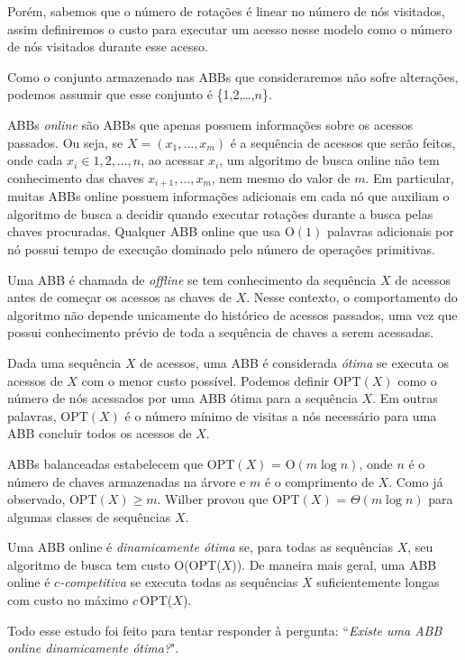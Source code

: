 Porém, sabemos que o número de rotações é linear no número de nós visitados, assim definiremos o custo para executar um acesso nesse modelo como o número de nós visitados durante esse acesso.

Como o conjunto armazenado nas ABBs que consideraremos não sofre alterações, podemos assumir que esse conjunto é \{1,2,\ldots,$n$\}.

ABBs \textit{online} são ABBs que apenas possuem informações sobre os acessos passados. Ou seja, se $X = (x_1, \ldots, x_m)$ é a sequência de acessos que serão feitos, onde cada $x_i \in {1,2,\ldots,n}$, ao acessar $x_{i}$, um algoritmo de busca online não tem conhecimento das chaves $x_{i+1},\ldots,x_{m}$, nem mesmo do valor de $m$. Em particular, muitas ABBs online possuem informações adicionais em cada nó que auxiliam o algoritmo de busca a decidir quando executar rotações durante a busca pelas chaves procuradas. Qualquer ABB online que usa O$(1)$ palavras adicionais por nó possui tempo de execução dominado pelo número de operações primitivas.

Uma ABB é chamada de \textit{offline} se tem conhecimento da sequência $X$ de acessos antes de começar os acessos as chaves de $X$. Nesse contexto, o comportamento do algoritmo não depende unicamente do histórico de acessos passados, uma vez que possui conhecimento prévio de toda a sequência de chaves a serem acessadas.

Dada uma sequência $X$ de acessos, uma ABB é considerada \textit{ótima} se executa os acessos de $X$ com o menor custo possível. Podemos definir OPT$(X)$ como o número de nós acessados por uma ABB ótima para a sequência $X$. Em outras palavras, OPT$(X)$ é o número mínimo de visitas a nós necessário para uma ABB concluir todos os acessos de $X$. 

ABBs balanceadas estabelecem que OPT$(X)$ = O$(m \log n)$, onde $n$ é o número de chaves armazenadas na árvore e $m$ é o comprimento de $X$. Como já observado, $\text{OPT}(X) \geq m$. Wilber \cite{lowerbound_wilber} provou que OPT$(X)$ = $\Theta$$(m \log n)$ para algumas classes de sequências $X$. 

Uma ABB online é \textit{dinamicamente ótima} se, para todas as sequências $X$, seu algoritmo de busca tem custo O(OPT($X$)). De maneira mais geral, uma ABB online é \textit{$c$-competitiva} se executa todas as sequências $X$ suficientemente longas com custo no máximo $c$\,OPT($X$).

Todo esse estudo foi feito para tentar responder à pergunta: ``\textit{Existe uma ABB online dinamicamente ótima?}".

